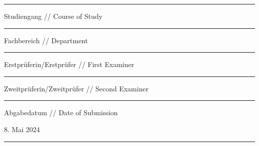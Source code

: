 {\begin{titlepage}
			\noindent\rule{15cm}{0.4pt}
			
			\vskip 0.05cm

			\begingroup
			\fontsize{8pt}{6pt}\selectfont
			Studiengang // Course of Study
			\endgroup

			\vskip -0.15cm

			\begingroup
			\fontsize{12pt}{14pt}\selectfont
				{\@courseOfStudies}
			\endgroup
			\vskip -0.15cm

			\noindent\rule{15cm}{0.4pt}
			
			\vskip 0.05cm

			\begingroup
			\fontsize{8pt}{6pt}\selectfont
			Fachbereich // Department
			\endgroup

			\vskip -0.15cm

			\begingroup
			\fontsize{12pt}{14pt}\selectfont
				{\@discipline}
			\endgroup
			\vskip -0.15cm

			\noindent\rule{15cm}{0.4pt}
			
			\vskip 0.05cm

			\begingroup
			\fontsize{8pt}{6pt}\selectfont
			Erstprüferin/Erstprüfer // First Examiner
			\endgroup

			\vskip -0.15cm

			\begingroup
			\fontsize{12pt}{14pt}\selectfont
				{\@firstExaminer}
			\endgroup
			\vskip -0.15cm

			\noindent\rule{15cm}{0.4pt}
			
			\vskip 0.05cm

			\begingroup
			\fontsize{8pt}{6pt}\selectfont
			Zweitprüferin/Zweitprüfer // Second Examiner
			\endgroup

			\vskip -0.15cm

			\begingroup
			\fontsize{12pt}{14pt}\selectfont
				{\@secondExaminer}
			\endgroup
			\vskip -0.15cm

			\noindent\rule{15cm}{0.4pt}
			
			\vskip 0.05cm

			\begingroup
			\fontsize{8pt}{6pt}\selectfont
			Abgabedatum // Date of Submission
			\endgroup

			\vskip -0.15cm

			\begingroup
			\fontsize{12pt}{14pt}\selectfont
				{8. Mai 2024}
			\endgroup
			\vskip -0.15cm

			\noindent\rule{15cm}{0.4pt}
		\restoregeometry
	\end{titlepage}
}
\makeatother
